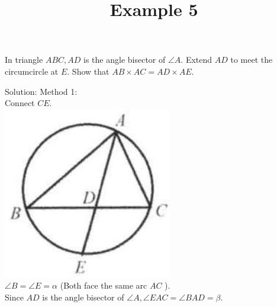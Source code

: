 \documentclass{article}
\title{Example 5}
\date{}
\begin{document}
\maketitle

In triangle \(A B C, A D\) is the angle bisector of \(\angle A\). Extend \(A D\) to meet the circumcircle at \(E\). Show that \(A B \times A C=A D \times A E\).

Solution:
Method 1:\\
Connect \(C E\).\\
\centering
\includegraphics[width=\textwidth]{images/165(1).jpg}\\
\(\angle B=\angle E=\alpha\) (Both face the same arc \(A C\) ).\\
Since \(A D\) is the angle bisector of \(\angle A, \angle E A C=\angle B A D=\beta\).
\end{document}
